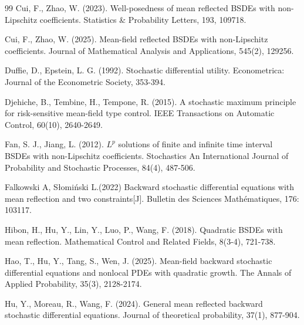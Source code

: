 \documentclass[10pt]{article}%
\numberwithin{equation}{section}
\begin{document}
\begin{thebibliography}{99}
 Cui, F., Zhao, W. (2023). Well-posedness of mean reflected BSDEs with non-Lipschitz coefficients. Statistics \& Probability Letters, 193, 109718.

 Cui, F., Zhao, W. (2025). Mean-field reflected BSDEs with non-Lipschitz coefficients. Journal of Mathematical Analysis and Applications, 545(2), 129256.

 Duffie, D., Epstein, L. G. (1992). Stochastic differential utility. Econometrica: Journal of the Econometric Society, 353-394.

 Djehiche, B., Tembine, H., Tempone, R. (2015). A stochastic maximum principle for risk-sensitive mean-field type control. IEEE Transactions on Automatic Control, 60(10), 2640-2649.


 Fan, S. J., Jiang, L. (2012). $L^p$ solutions of finite and infinite time interval BSDEs with non-Lipschitz coefficients. Stochastics An International Journal of Probability and Stochastic Processes, 84(4), 487-506.


  Falkowski A, Słomiński L.(2022) Backward stochastic differential equations with mean reflection and two constraints[J]. Bulletin des Sciences Mathématiques, 176: 103117.
 
  Hibon, H., Hu, Y., Lin, Y., Luo, P., Wang, F. (2018). Quadratic BSDEs with mean reflection. Mathematical Control and Related Fields, 8(3-4), 721-738.
 
 Hao, T., Hu, Y., Tang, S., Wen, J. (2025). Mean-field backward stochastic differential equations and nonlocal PDEs with quadratic growth. The Annals of Applied Probability, 35(3), 2128-2174.

  Hu, Y., Moreau, R., Wang, F. (2024). General mean reflected backward stochastic differential equations. Journal of theoretical probability, 37(1), 877-904.


\end{thebibliography}
\end{document}
